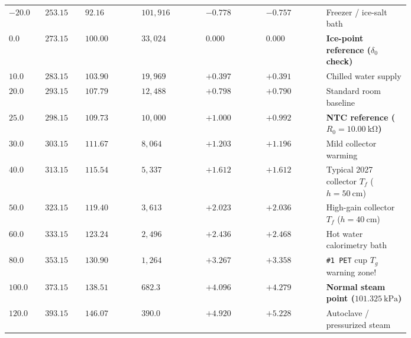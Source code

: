 \begin{table}[h!]
\centering
{}\label{tab:17:sensortable}
\footnotesize
\setlength{\tabcolsep}{4.5pt}
\renewcommand{\arraystretch}{1.12}
\begin{tabularx}{\linewidth}{@{}R{0.09\linewidth} R{0.10\linewidth} R{0.14\linewidth} R{0.16\linewidth} R{0.15\linewidth} R{0.15\linewidth} >{\raggedright\arraybackslash}X@{}}
\toprule
{} &  &  &  &  &  &  \\
\midrule
$-20.0$ & $253.15$ & $92.16$ & $101{,}916$ & $-0.778$ & $-0.757$ & Freezer / ice-salt bath \\
$0.0$ & $273.15$ & $100.00$ & $33{,}024$ & $0.000$ & $0.000$ & \textbf{Ice-point reference ($\delta_0$ check)} \\
$10.0$ & $283.15$ & $103.90$ & $19{,}969$ & $+0.397$ & $+0.391$ & Chilled water supply \\
$20.0$ & $293.15$ & $107.79$ & $12{,}488$ & $+0.798$ & $+0.790$ & Standard room baseline \\
$25.0$ & $298.15$ & $109.73$ & $10{,}000$ & $+1.000$ & $+0.992$ & \textbf{NTC reference ($R_0 = \SI{10.00}{\kilo\ohm}$)} \\
$30.0$ & $303.15$ & $111.67$ & $8{,}064$ & $+1.203$ & $+1.196$ & Mild collector warming \\
$40.0$ & $313.15$ & $115.54$ & $5{,}337$ & $+1.612$ & $+1.612$ & Typical 2027 collector $T_f$ ($h=\SI{50}{\centi\meter}$) \\
$50.0$ & $323.15$ & $119.40$ & $3{,}613$ & $+2.023$ & $+2.036$ & High-gain collector $T_f$ ($h=\SI{40}{\centi\meter}$) \\
$60.0$ & $333.15$ & $123.24$ & $2{,}496$ & $+2.436$ & $+2.468$ & Hot water calorimetry bath \\
$80.0$ & $353.15$ & $130.90$ & $1{,}264$ & $+3.267$ & $+3.358$ & \texttt{\#1 PET} cup $T_g$ warning zone! \\
$100.0$ & $373.15$ & $138.51$ & $682.3$ & $+4.096$ & $+4.279$ & \textbf{Normal steam point ($\SI{101.325}{\kilo\pascal}$)} \\
$120.0$ & $393.15$ & $146.07$ & $390.0$ & $+4.920$ & $+5.228$ & Autoclave / pressurized steam \\
\bottomrule
\end{tabularx}
\end{table}

